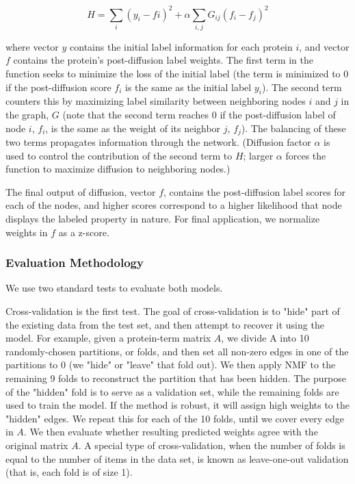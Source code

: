 \documentclass[12pt,a4paper]{report}
\begin{document}
\begin{equation*} \label{eq:GID_equation}
H = \sum_{i}(y_{i}-f{i})^{2} + \alpha \sum_{i,j}G_{ij}(f_{i}-f_{j})^{2}
\tag{15}
\end{equation*}

where vector $y$ contains the initial label information for each protein $i$, and vector $f$ contains the protein's post-diffusion label weights. The first term in the function seeks to minimize the loss of the initial label (the term is minimized to 0 if the post-diffusion score $f_i$ is the same as the initial label $y_{i}$). The second term counters this by maximizing label similarity between neighboring nodes $i$ and $j$ in the graph, $G$ (note that the second term reaches 0 if the post-diffusion label of node $i$, $f_{i}$, is the same as the weight of its neighbor $j$, $f_{j}$). The balancing of these two terms propagates information through the network. (Diffusion factor $\alpha$ is used to control the contribution of the second term to $H$; larger $\alpha$ forces the function to maximize diffusion to neighboring nodes.)

The final output of diffusion, vector $f$, contains the post-diffusion label scores for each of the nodes, and higher scores correspond to a higher likelihood that node displays the labeled property in nature. For final application, we normalize weights in $f$ as a z-score.

\subsubsection{Evaluation Methodology}

We use two standard tests to evaluate both models.

Cross-validation is the first test. The goal of cross-validation is to "hide" part of the existing data from the test set, and then attempt to recover it using the model. For example, given a protein-term matrix $A$, we divide A into 10 randomly-chosen partitions, or folds, and then set all non-zero edges in one of the partitions to 0 (we "hide" or "leave" that fold out). We then apply NMF to the remaining 9 folds to reconstruct the partition that has been hidden. The purpose of the "hidden" fold is to serve as a validation set, while the remaining folds are used to train the model. If the method is robust, it will assign high weights to the "hidden" edges. We repeat this for each of the 10 folds, until we cover every edge in $A$. We then evaluate whether resulting predicted weights agree with the original matrix $A$. A special type of cross-validation, when the number of folds is equal to the number of items in the data set, is known as leave-one-out validation (that is, each fold is of size 1).
\end{document}
